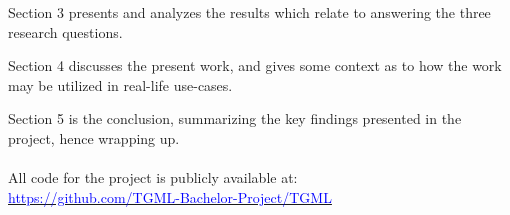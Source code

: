 Section 3 presents and analyzes the results which relate to answering the three research questions.

Section 4 discusses the present work, and gives some context as to how the work may be utilized in real-life use-cases.

Section 5 is the conclusion, summarizing the key findings presented in the project, hence wrapping up.
\\\\
All code for the project is publicly available at:
\\
\href{https://github.com/TGML-Bachelor-Project/TGML}{\textcolor{blue}{https://github.com/TGML-Bachelor-Project/TGML}}





